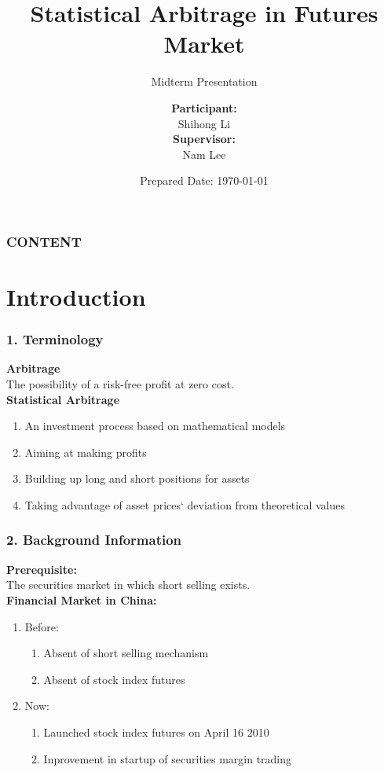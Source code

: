 \documentclass[compress,handout,10pt]{beamer}
\title{{\color{black} \LARGE Statistical Arbitrage in Futures Market\newline} }
\subtitle{{\color{black} Midterm Presentation\large } }
\author{ 
    {\bf{Participant:}} \\ 
Shihong Li\\ 
    \vspace{5pt}
    {\bf{Supervisor:}} \\ 
Nam Lee\\ 
    \vspace{5pt}
}
\institute{
{\bf{Sponsor:}}\\
Greenwoods Asset Management Ltd.\\
\vspace{5pt}
}
\date{\mygreen Prepared Date: \today}
\let\olditem\item
\renewcommand{\item}{\setlength{\itemsep}{0.5\baselineskip}\olditem}
\begin{document}
\begin{frame}[plain]
    \titlepage
\end{frame}

\begin{frame}
    \frametitle{CONTENT}
    \tableofcontents
\end{frame}

\section{Introduction}

\begin{frame}
    \frametitle{1. Terminology}
{\bf{Arbitrage}} \\The possibility of a risk-free profit at zero cost. \\
\vspace{7pt}
{\bf{Statistical Arbitrage}}
             \begin{enumerate}
                 \item An investment process based on mathematical models
                 \item Aiming at making profits
                 \item Building up long and short positions for assets
                 \item Taking advantage of asset prices` deviation from theoretical values
             \end{enumerate}
\end{frame}

\begin{frame}
    \frametitle{2. Background Information}
{\bf{Prerequisite:}}\\
\vspace{3pt}
The securities market in which short selling exists.\\
\vspace{7pt}
{\bf{Financial Market in China:}}\\
    \begin{enumerate}
        \item Before: 
            \begin{enumerate}
                \item Absent of short selling mechanism
                \item Absent of stock index futures
            \end{enumerate}
        \item Now:
            \begin{enumerate}
                \item Launched stock index futures on April 16 2010
                \item Inprovement in startup of securities margin trading
            \end{enumerate}
    \end{enumerate}
\end{frame}
\end{document}
